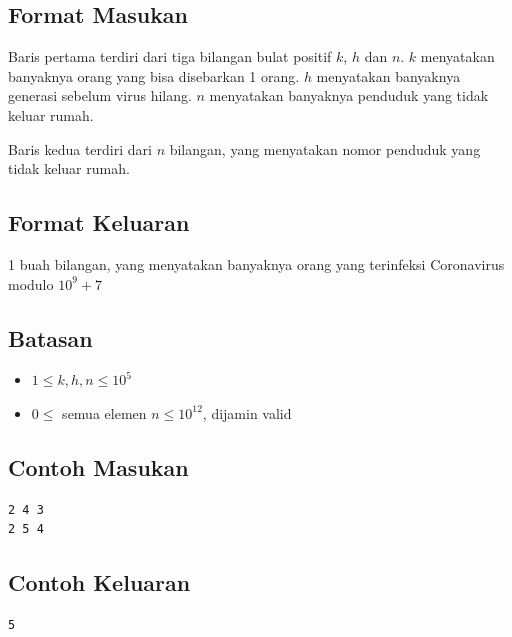 \documentclass{article}
\begin{document}
\subsection*{Format Masukan}

Baris pertama terdiri dari tiga bilangan bulat positif $k$, $h$ dan $n$. $k$ menyatakan banyaknya orang yang bisa disebarkan 1 orang. $h$ menyatakan banyaknya generasi sebelum virus hilang. $n$ menyatakan banyaknya penduduk yang tidak keluar rumah.
\par
Baris kedua terdiri dari $n$ bilangan, yang menyatakan nomor penduduk yang tidak keluar rumah.

\subsection*{Format Keluaran}

1 buah bilangan, yang menyatakan banyaknya orang yang terinfeksi Coronavirus modulo $10^9+7$

\subsection*{Batasan}

\begin{itemize}
    \setlength\itemsep{0pt}
    \item $1 \leq k, h, n \leq 10^5$
    \item $0 \leq $ semua elemen $n \leq 10^{12}$, dijamin valid
\end{itemize}

\begin{multicols}{2}
\subsection*{Contoh Masukan}
\begin{lstlisting}
2 4 3
2 5 4
\end{lstlisting}
\columnbreak
\subsection*{Contoh Keluaran}
\begin{lstlisting}
5
\end{lstlisting}
\vfill
\null
\end{multicols}
\end{document}
